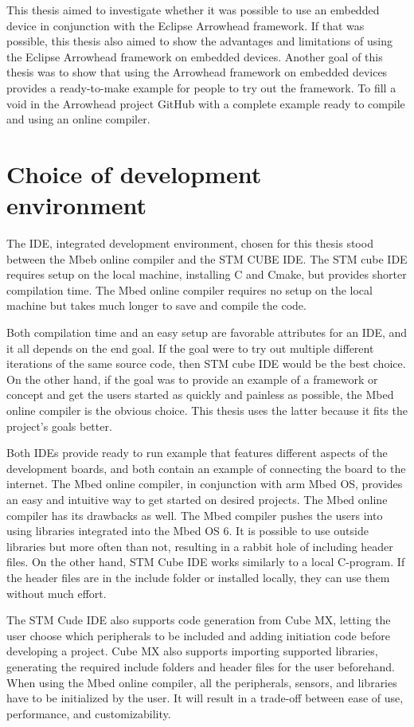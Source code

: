 This thesis aimed to investigate whether it was possible to use an embedded device in conjunction with the Eclipse Arrowhead framework.
If that was possible, this thesis also aimed to show the advantages and limitations of using the Eclipse Arrowhead framework on embedded devices.
Another goal of this thesis was to show that using the Arrowhead framework on embedded devices provides a ready-to-make example for people to try out the framework.
To fill a void in the Arrowhead project GitHub with a complete example ready to compile and using an online compiler.

\section{Choice of development environment}
The IDE, integrated development environment, chosen for this thesis stood between the Mbeb online compiler and the STM CUBE IDE. 
The STM cube IDE requires setup on the local machine, installing C and Cmake, but provides shorter compilation time.
The Mbed online compiler requires no setup on the local machine but takes much longer to save and compile the code.

Both compilation time and an easy setup are favorable attributes for an IDE, and it all depends on the end goal.
If the goal were to try out multiple different iterations of the same source code, then STM cube IDE would be the best choice.
On the other hand, if the goal was to provide an example of a framework or concept and get the users started as quickly and painless as possible, the Mbed online compiler is the obvious choice.
This thesis uses the latter because it fits the project's goals better.  


Both IDEs provide ready to run example that features different aspects of the development boards, and both contain an example of connecting the board to the internet.
The Mbed online compiler, in conjunction with arm Mbed OS, provides an easy and intuitive way to get started on desired projects.
The Mbed online compiler has its drawbacks as well. 
The Mbed compiler pushes the users into using libraries integrated into the Mbed OS 6.
It is possible to use outside libraries but more often than not, resulting in a rabbit hole of including header files.
On the other hand, STM Cube IDE works similarly to a local C-program. 
If the header files are in the include folder or installed locally, they can use them without much effort.

The STM Cude IDE also supports code generation from Cube MX, letting the user choose which peripherals to be included and adding initiation code before developing a project.
Cube MX also supports importing supported libraries, generating the required include folders and header files for the user beforehand. 
When using the Mbed online compiler, all the peripherals, sensors, and libraries have to be initialized by the user.
It will result in a trade-off between ease of use, performance, and customizability.

